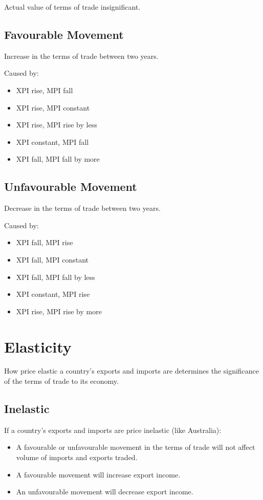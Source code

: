 \documentclass[a4paper,11pt]{report}
\begin{document}
Actual value of terms of trade insignificant.

\subsection{Favourable Movement}

Increase in the terms of trade between two years.

Caused by:

\begin{itemize}
\item XPI rise, MPI fall
\item XPI rise, MPI constant
\item XPI rise, MPI rise by less
\item XPI constant, MPI fall
\item XPI fall, MPI fall by more
\end{itemize}

\subsection{Unfavourable Movement}

Decrease in the terms of trade between two years.

Caused by:

\begin{itemize}
\item XPI fall, MPI rise
\item XPI fall, MPI constant
\item XPI fall, MPI fall by less
\item XPI constant, MPI rise
\item XPI rise, MPI rise by more
\end{itemize}


\section{Elasticity}

How price elastic a country's exports and imports are determines the
significance of the terms of trade to its economy.

\subsection{Inelastic}

If a country's exports and imports are price inelastic (like Australia):

\begin{itemize}
\item A favourable or unfavourable movement in the terms of trade will not
	affect volume of imports and exports traded.
\item A favourable movement will increase export income.
\item An unfavourable movement will decrease export income.
\end{itemize}
\end{document}
